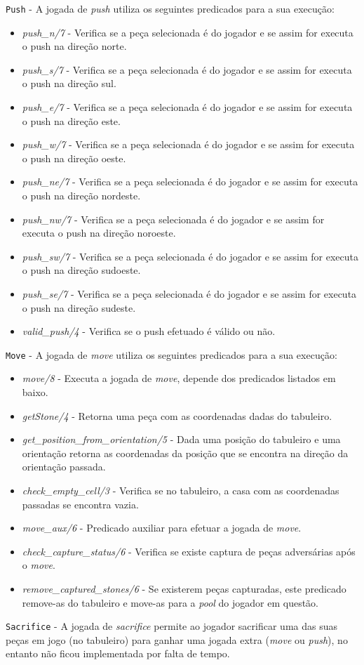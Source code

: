 \documentclass[a4paper]{article}
\begin{document}
	\texttt{Push} - A jogada de \textit{push} utiliza os seguintes predicados para a sua execução:
	\begin{itemize}
		\item \textit{push\_n/7} - Verifica se a peça selecionada é do jogador e se assim for executa o push na direção norte.
		\item \textit{push\_s/7} - Verifica se a peça selecionada é do jogador e se assim for executa o push na direção sul.
		\item \textit{push\_e/7} - Verifica se a peça selecionada é do jogador e se assim for executa o push na direção este.
		\item \textit{push\_w/7} - Verifica se a peça selecionada é do jogador e se assim for executa o push na direção oeste.
		\item \textit{push\_ne/7} - Verifica se a peça selecionada é do jogador e se assim for executa o push na direção nordeste.
		\item \textit{push\_nw/7} - Verifica se a peça selecionada é do jogador e se assim for executa o push na direção noroeste.
		\item \textit{push\_sw/7} - Verifica se a peça selecionada é do jogador e se assim for executa o push na direção sudoeste.
		\item \textit{push\_se/7} - Verifica se a peça selecionada é do jogador e se assim for executa o push na direção sudeste.
		\item \textit{valid\_push/4} - Verifica se o push efetuado é válido ou não.
	\end{itemize}
	\texttt{Move} - A jogada de \textit{move} utiliza os seguintes predicados para a sua execução:
	\begin{itemize}
		\item \textit{move/8} - Executa a jogada de \textit{move}, depende dos predicados listados em baixo.
		\item \textit{getStone/4} - Retorna uma peça com as coordenadas dadas do tabuleiro.
		\item \textit{get\_position\_from\_orientation/5} - Dada uma posição do tabuleiro e uma orientação retorna as coordenadas da posição que se encontra na direção da orientação passada.
		\item \textit{check\_empty\_cell/3} - Verifica se no tabuleiro, a casa com as coordenadas passadas se encontra vazia.
		\item \textit{move\_aux/6} - Predicado auxiliar para efetuar a jogada de \textit{move}.
		\item \textit{check\_capture\_status/6} - Verifica se existe captura de peças adversárias após o \textit{move}.
		\item \textit{remove\_captured\_stones/6} - Se existerem peças capturadas, este predicado remove-as do tabuleiro e move-as para a \textit{pool} do jogador em questão.
	\end{itemize}
	\texttt{Sacrifice} - A jogada de \textit{sacrifice} permite ao jogador sacrificar uma das suas peças em jogo (no tabuleiro) para ganhar uma jogada extra (\textit{move} ou \textit{push}), no entanto não ficou implementada por falta de tempo.
\end{document}
